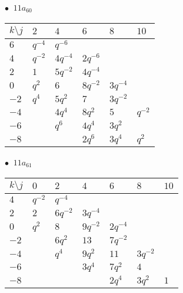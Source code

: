 \begin{minipage}{\linewidth}
$\bullet\ $ $11a_{60}$ \vspace{0.5em} \\
\begin{tabular}{l|lllll}
$k \setminus j$ & $2$ & $4$ & $6$ & $8$ & $10$ \\
\hline
$6$ & $q^{-4}$ & $q^{-6}$ &  &  &  \\
$4$ & $q^{-2}$ & $4q^{-4}$ & $2q^{-6}$ &  &  \\
$2$ & $1$ & $5q^{-2}$ & $4q^{-4}$ &  &  \\
$0$ & $q^{2}$ & $6$ & $8q^{-2}$ & $3q^{-4}$ &  \\
$-2$ & $q^{4}$ & $5q^{2}$ & $7$ & $3q^{-2}$ &  \\
$-4$ &  & $4q^{4}$ & $8q^{2}$ & $5$ & $q^{-2}$ \\
$-6$ &  & $q^{6}$ & $4q^{4}$ & $3q^{2}$ &  \\
$-8$ &  &  & $2q^{6}$ & $3q^{4}$ & $q^{2}$ \\
\end{tabular}
\vspace{2em}
\end{minipage}
%
\begin{minipage}{\linewidth}
$\bullet\ $ $11a_{61}$ \vspace{0.5em} \\
\begin{tabular}{l|llllll}
$k \setminus j$ & $0$ & $2$ & $4$ & $6$ & $8$ & $10$ \\
\hline
$4$ & $q^{-2}$ & $q^{-4}$ &  &  &  &  \\
$2$ & $2$ & $6q^{-2}$ & $3q^{-4}$ &  &  &  \\
$0$ & $q^{2}$ & $8$ & $9q^{-2}$ & $2q^{-4}$ &  &  \\
$-2$ &  & $6q^{2}$ & $13$ & $7q^{-2}$ &  &  \\
$-4$ &  & $q^{4}$ & $9q^{2}$ & $11$ & $3q^{-2}$ &  \\
$-6$ &  &  & $3q^{4}$ & $7q^{2}$ & $4$ &  \\
$-8$ &  &  &  & $2q^{4}$ & $3q^{2}$ & $1$ \\
\end{tabular}
\vspace{2em}
\end{minipage}
%
